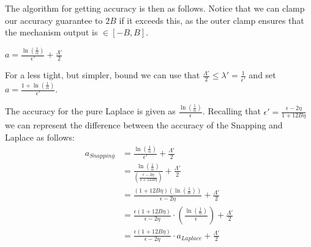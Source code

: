 \documentclass[11pt]{scrartcl} %
\begin{document}
The algorithm for getting accuracy is then as follows. Notice that we can clamp our accuracy guarantee to $2B$ if it
exceeds this, as the outer clamp ensures that the mechanism output is $\in [-B, B]$.
\begin{algorithm}
	\label{GetAccuracy2}
	\begin{algorithmic}
			\State $a = \frac{\ln \left( \frac{1}{\alpha} \right)}{\epsilon'} + \frac{\Lambda'}{2}$
					\State{}
			\Else{}
				\State{}
			\EndIf
		\EndFunction
	\end{algorithmic}
\end{algorithm}

For a less tight, but simpler, bound we can use that $\frac{\Lambda'}{2} \leq \lambda' = 
\frac{1}{\epsilon'}$ and set $a = \frac{1 + \ln \left( \frac{1}{\alpha} \right)}{\epsilon'}$. \newline 

The accuracy for the pure Laplace is given as $\frac{\ln \left( \frac{1}{\alpha} \right)}{\epsilon}$. Recalling that
$\epsilon' = \frac{\epsilon - 2\eta}{1 + 12B\eta}$ we can represent the difference between the accuracy of the
Snapping and Laplace as follows:
\begin{align*}
	a_{Snapping} &= \frac{\ln \left( \frac{1}{\alpha} \right)}{\epsilon'} + \frac{\Lambda'}{2} \\
	&= \frac{\ln \left( \frac{1}{\alpha} \right)}{\left( \frac{\epsilon - 2\eta}{1 + 12B\eta} \right)} + \frac{\Lambda'}{2} \\
	&= \frac{(1 + 12B \eta) \left(\ln \left( \frac{1}{\alpha} \right) \right)}{\epsilon - 2\eta} + \frac{\Lambda'}{2} \\
	&= \frac{\epsilon(1 + 12B \eta)}{\epsilon - 2\eta } \cdot \left(\frac{\ln \left( \frac{1}{\alpha} \right)}{\epsilon} \right) + \frac{\Lambda'}{2} \\
	&= \frac{\epsilon(1 + 12B \eta)}{\epsilon - 2\eta} \cdot a_{Laplace} + \frac{\Lambda'}{2}
\end{align*}
\end{document}
